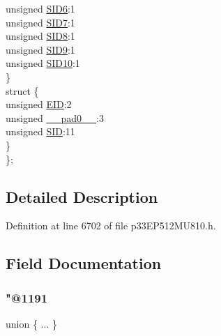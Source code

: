 \begin{DoxyCompactItemize}
\begin{tabbing}
\>\>unsigned \hyperlink{structtag_c2_r_x_f9_s_i_d_b_i_t_s_a70d70952133eb2389d5c326f9f0e8035}{SID6}:1\\
\>\>unsigned \hyperlink{structtag_c2_r_x_f9_s_i_d_b_i_t_s_a34097fb76decd431701fa2d86a22328e}{SID7}:1\\
\>\>unsigned \hyperlink{structtag_c2_r_x_f9_s_i_d_b_i_t_s_afe74894633244fdb0b0c01b4e8c522e7}{SID8}:1\\
\>\>unsigned \hyperlink{structtag_c2_r_x_f9_s_i_d_b_i_t_s_a33587704948067005c2a6a3ccc503c99}{SID9}:1\\
\>\>unsigned \hyperlink{structtag_c2_r_x_f9_s_i_d_b_i_t_s_a1a9084031c7f5fb16007feeebf0d8216}{SID10}:1\\
\>\} \\
\>struct \{\\
\>\>unsigned \hyperlink{structtag_c2_r_x_f9_s_i_d_b_i_t_s_ae80b378c9141f7c03e0b4e55b5f4b54d}{EID}:2\\
\>\>unsigned \hyperlink{structtag_c2_r_x_f9_s_i_d_b_i_t_s_adf71f3d8410c1f1dbbc96680a92c49af}{\_\_pad0\_\_}:3\\
\>\>unsigned \hyperlink{structtag_c2_r_x_f9_s_i_d_b_i_t_s_af88edf93b2fee2432665bd84f51287e4}{SID}:11\\
\>\} \\
\}; \\

\end{tabbing}\end{DoxyCompactItemize}


\subsection{Detailed Description}


Definition at line 6702 of file p33\+E\+P512\+M\+U810.\+h.



\subsection{Field Documentation}
\mbox{\label{structtag_c2_r_x_f9_s_i_d_b_i_t_s_a6e232ee7e471e56fcb386bbcce046e15}} 
\subsubsection{\texorpdfstring{"@1191}{@1191}}
{\footnotesize\ttfamily union \{ ... \} }

\mbox{\label{structtag_c2_r_x_f9_s_i_d_b_i_t_s_adf71f3d8410c1f1dbbc96680a92c49af}} 
